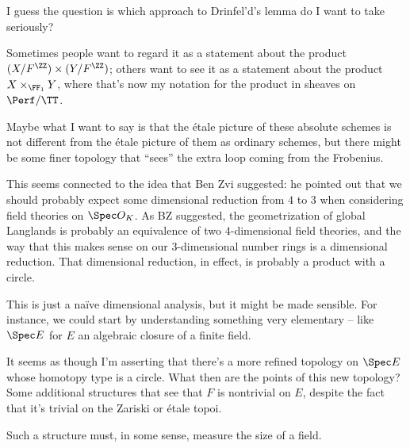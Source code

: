 
I guess the question is
which approach to Drinfel'd's lemma do I want to take seriously?

Sometimes people want to regard it as a statement about the product
$(X/F^{\ZZ})\times(Y/F^{\ZZ})$;
others want to see it as a statement about the product
$X \times_{\FF_1} Y$,
where that's now my notation for the product in sheaves on $\Perf/\TT$.

Maybe what I want to say is that the étale picture of these absolute schemes is not different from the étale picture of them as ordinary schemes,
but there might be some finer topology that ``sees'' the extra loop coming from the Frobenius.

This seems connected to the idea that Ben Zvi suggested:
he pointed out that we should probably expect some dimensional reduction from $4$ to $3$ when considering field theories on $\Spec O_K$.
As BZ suggested, the geometrization of global Langlands is probably an equivalence of two $4$-dimensional field theories, 
and the way that this makes sense on our $3$-dimensional number rings is a dimensional reduction.
That dimensional reduction, in effect, is probably a product with a circle.

This is just a naïve dimensional analysis, but
it might be made sensible.
For instance, we could start by understanding something very elementary --
like $\Spec E$ for $E$ an algebraic closure of a finite field.

It seems as though I'm asserting that there's a more refined topology on $\Spec E$
whose homotopy type is a circle.
What then are the points of this new topology?
Some additional structures that see that $F$ is nontrivial on $E$,
despite the fact that it's trivial on the Zariski or étale topoi.

Such a structure must, in some sense, measure the size of a field.
